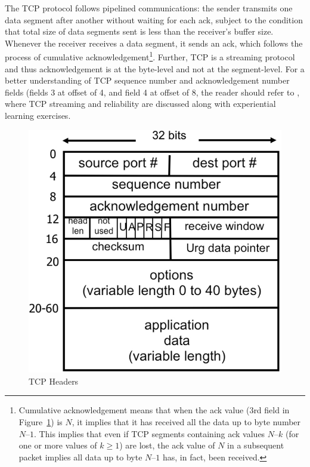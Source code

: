 \begin{multicols}{2}
The TCP protocol follows pipelined communications: the sender transmits one data segment after another without waiting for each ack, subject to the condition that total size of data segments sent is less than the receiver’s buffer size. Whenever the receiver receives a data segment, it sends an ack, which follows the process of cumulative acknowledgement\footnote{Cumulative acknowledgement means that when the ack value (3rd field in Figure~\ref{chap3-fig01}) is $N$, it implies that it has received all the data up to byte number $N – 1$. This implies that even if TCP segments containing ack values $N – k$ (for one or more values of $k \geq 1$) are lost, the ack value of $N$ in a subsequent packet implies all data up to byte $N – 1$ has, in fact, been received.}. Further, TCP is a streaming protocol and thus acknowledgement is at the byte-level and not at the segment-level. For a better understanding of TCP sequence number and acknowledgement number fields (fields 3 at offset of 4, and field 4 at offset of 8, the reader should refer to \cite{art3-key04}\cite{art3-key09}, where TCP streaming and reliability are discussed along with experiential learning exercises.
\setcounter{figure}{0}
\begin{figure}[H]
\centering
\includegraphics[scale=.95]{src/Figures/chap3/chap3-fig01.jpg}
\caption{TCP Headers}\label{chap3-fig01}
\end{figure}


\end{multicols}
